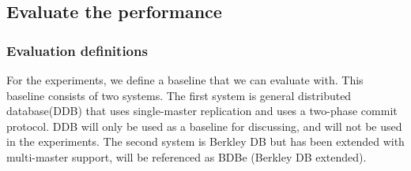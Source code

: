 


\subsection{Evaluate the performance} 
\label{subsec:experiment}


\subsubsection{Evaluation definitions} %
\label{ssub:evaluation_baseline}

For the experiments, we define a baseline that we can evaluate with. This baseline consists of two systems. The first system is general distributed database(DDB) that uses single-master replication and uses a two-phase commit protocol. DDB will only be used as a baseline for discussing, and will not be used in the experiments. The second system is Berkley DB but has been extended with multi-master support, will be referenced as BDBe (Berkley DB extended). 

